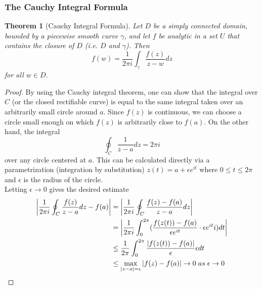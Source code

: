 \documentclass{article}
\newtheorem{theorem}{Theorem}[section]
\begin{document}
\subsubsection{The Cauchy Integral Formula}
\begin{theorem}[Cauchy Integral Formula]
Let $D$ be a simply connected domain, bounded by a piecewise smooth curve $\gamma$, and let $f$ be analytic in a set $U$ that contains the closure of $D$ (i.e. $D$ and $\gamma$). Then
\begin{equation*}
f(w) = \frac{1}{2\pi i} \int_{\gamma} \frac{f(z)}{z - w}dz
\end{equation*}
for all $w \in D$.
\end{theorem}
\begin{proof}
By using the Cauchy integral theorem, one can show that the integral over $C$ (or the closed rectifiable curve) is equal to the same integral taken over an arbitrarily small circle around $a$. Since $f(z)$ is continuous, we can choose a circle small enough on which $f(z)$ is arbitrarily close to $f(a)$. On the other hand, the integral
\begin{equation*}
\oint_{C} \frac{1}{z - a}dz = 2\pi i
\end{equation*}
over any circle centered at $a$. This can be calculated directly via a parametrization (integration by substitution) $z(t) = a + \epsilon e^{it}$ where $0 \leq t \leq 2\pi$ and $\epsilon$ is the radius of the circle. \\
Letting $\epsilon \to 0$ gives the desired estimate
\begin{align*}
\left| \frac{1}{2\pi i} \oint_{C} \frac{f(z)}{z-a}dz - f(a) \right| &= \left| \frac{1}{2\pi i}\oint_{C} \frac{f(z) - f(a)}{z - a}dz \right| \\
&= \left| \frac{1}{2\pi i} \int_0^{2\pi} (\frac{f(z(t)) - f(a)}{\epsilon e^{it}} \cdot \epsilon e^{it}i) dt \right| \\
&\leq \frac{1}{2\pi} \int_0^{2\pi} \frac{\left|f(z(t)) - f(a) \right|}{\epsilon} \epsilon dt \\
&\leq \max_{\left|z - a\right| = \epsilon} \left|f(z) - f(a)\right| \to 0 \hspace{0.1cm} as \hspace{0.1cm} \epsilon \to 0
\end{align*}
\end{proof}
\end{document}
